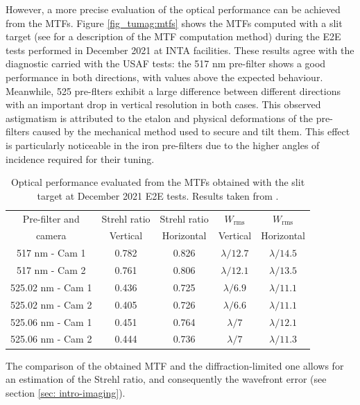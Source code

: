 However, a more precise evaluation of the optical performance can be achieved from the MTFs. Figure \ref{fig_tumag:mtfs} shows the MTFs computed with a slit target (see \cite{slanted-method} for a description of the MTF computation method) during the E2E tests performed in December 2021 at INTA facilities. These results agree with the diagnostic carried with the USAF tests: the 517 nm pre-filter shows a good performance in both directions, with values above the expected behaviour. Meanwhile, 525 pre-flters exhibit a large difference between different directions with an important drop in vertical resolution in both cases. This observed astigmatism is attributed to the etalon and physical deformations of the pre-filters caused by the mechanical method used to secure and tilt them. This effect is particularly noticeable in the iron pre-filters due to the higher angles of incidence required for their tuning.

\begin{table}[t]
    \centering
   \begin{tabular}{ccccc}
    \hline
    \hline
    Pre-filter and & Strehl ratio & Strehl ratio & $W_{\text{rms}}$& $W_{\text{rms}}$\\
    camera & Vertical & Horizontal & Vertical & Horizontal\\
    \hline
    517 nm - Cam 1 & 0.782 & 0.826 & $\lambda/12.7$ & $\lambda/14.5$ \\
    517 nm - Cam 2 & 0.761 & 0.806 & $\lambda/12.1$ & $\lambda/13.5$ \\
    525.02 nm - Cam 1 & 0.436 & 0.725 & $\lambda/6.9$ & $\lambda/11.1$ \\
    525.02 nm - Cam 2 & 0.405 & 0.726 & $\lambda/6.6$ & $\lambda/11.1$ \\
    525.06 nm - Cam 1 & 0.451 & 0.764 & $\lambda/7$ & $\lambda/12.1$ \\
    525.06 nm - Cam 2 & 0.444 & 0.736 & $\lambda/7$ & $\lambda/11.3$ \\
    \hline
    \hline
    \end{tabular}
    \caption{Optical performance evaluated from the MTFs obtained with the slit target at December 2021 E2E tests. Results taken from \citep{e2e-tests-inta}.}
    \label{table: Optical-performance}
\end{table}


The comparison of the obtained MTF and the diffraction-limited one allows for an estimation of the Strehl ratio, and consequently the wavefront error (see section \ref{sec: intro-imaging}).

